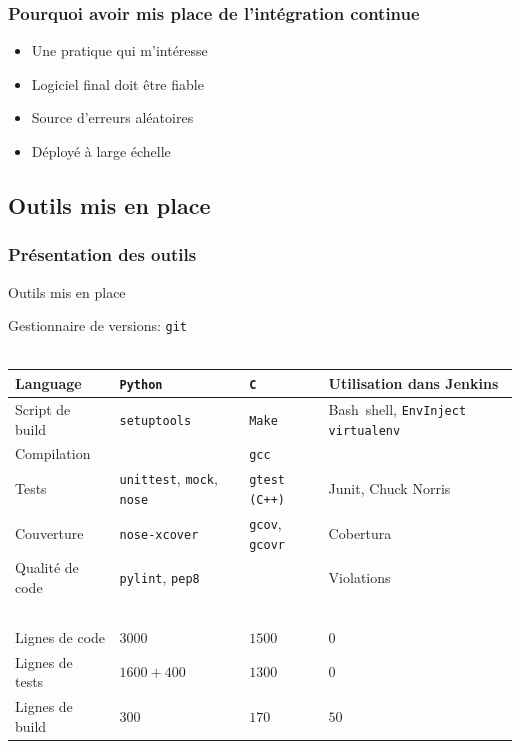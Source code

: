 \documentclass[9pt]{beamer}
\newcommand{\tocsubsection}{
  \begin{frame}
    \tableofcontents[
      currentsubsection,
      sectionstyle=show/shaded,
      subsectionstyle=show/shaded,
      subsubsectionstyle=show/show/shaded
    ]
  \end{frame}
}
\begin{document}
\subsubsection{Pourquoi avoir mis place de l'intégration continue}
\begin{frame}{\subsubsecname} %
  \begin{itemize}
    \item Une pratique qui m'intéresse
    \item Logiciel final doit être fiable
    \item Source d'erreurs aléatoires
    \item Déployé à large échelle
  \end{itemize}
\end{frame}



\subsection{Outils mis en place}
\tocsubsection

\subsubsection{Présentation des outils}
\begin{frame}{Outils mis en place}

  Gestionnaire de versions: \texttt{git} \\ ~ \\

  \begin{tabular}{ l | l l | p{3.5cm} }
    Language         & \texttt{Python}     & \texttt{C}    & Utilisation dans Jenkins \\ \hline
    Script de build  & \texttt{setuptools} & \texttt{Make} & Bash~shell, \texttt{EnvInject} \texttt{virtualenv}\\
    Compilation      & ~                   & \texttt{gcc}  & ~ \\
    Tests            & \texttt{unittest}, \texttt{mock}, \texttt{nose}
                     & \texttt{gtest} \texttt{(C++)}
                     & Junit, Chuck Norris\\
    Couverture       & \texttt{nose-xcover}
                     & \texttt{gcov}, \texttt{gcovr}
                     & Cobertura \\
   Qualité de code  & \texttt{pylint}, \texttt{pep8} & ~  & Violations \\
    ~ & ~  & ~ & \\
    Lignes de code   &  $3000$        &  $1500$  &  $0$  \\
    Lignes de tests  &  $1600 + 400$  &  $1300$  &  $0$  \\
    Lignes de build  &  $300$         &  $170$   &  $50$ \\

  \end{tabular}
\end{frame}
\end{document}
